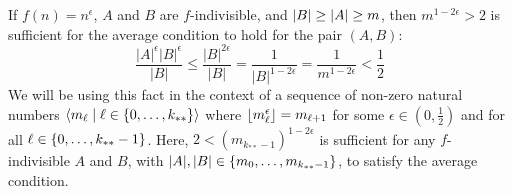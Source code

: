     \begin{remark}\label{sufficient_requirement_for_average_condition}
        If $f(n) = n^\epsilon$, $A$ and $B$ are $f$-indivisible, and $\left| B \right| \geq \left| A \right| \geq m$,
        then $m^{1-2\epsilon} > 2$ is sufficient for the average condition to hold for the pair $(A,B)$:
        \[
            \frac{|A|^\epsilon |B|^\epsilon}{|B|}
                \leq \frac{|B|^{2\epsilon}}{|B|}
                = \frac{1}{|B|^{1-2\epsilon}}
                = \frac{1}{m^{1-2\epsilon}}
                < \frac{1}{2}
        \]
        We will be using this fact in the context of a sequence of non-zero natural numbers
        $\left< m_\ell \mid \ell \in \left\{ 0, \dots, k_{**} \right\} \right>$ where $\left\lfloor m_\ell^\epsilon \right\rfloor = m_{\ell+1}$
        for some $\epsilon \in (0, \frac{1}{2})$ and for all $\ell \in \left\{ 0, \dots, k_{**}-1 \right\}$.
        Here, $2 < (m_{k_{**}-1})^{1-2\epsilon}$ is sufficient for any $f$-indivisible $A$ and $B$, with
        $|A|, |B| \in \left\{ m_0, \dots, m_{k_{**}-1} \right\}$, to satisfy the average condition.
    \end{remark}

